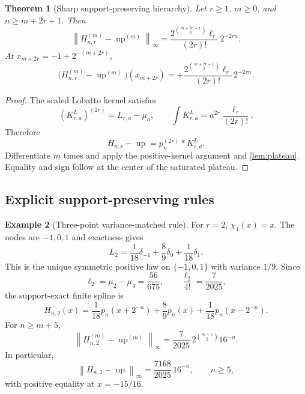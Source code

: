 \documentclass[11pt]{article}
\numberwithin{equation}{section}
\newtheorem{theorem}{Theorem}[section]
\theoremstyle{definition}
\newtheorem{example}[theorem]{Example}
\theoremstyle{remark}
\newcommand{\Up}{\operatorname{up}}
\newcommand{\norm}[1]{\left\lVert#1\right\rVert}
\begin{document}
\begin{theorem}[Sharp support-preserving hierarchy]
\label{thm:L-exact}
Let $r\ge1$, $m\ge0$, and $n\ge m+2r+1$.  Then
\begin{equation}
 \boxed{
 \norm{H_{n,r}^{(m)}-\Up^{(m)}}_\infty
 =\frac{2^{\binom{m+2r+1}{2}}\ell_r}{(2r)!}\,2^{-2rn}.}
 \label{eq:L-exact}
\end{equation}
At $x_{m+2r}=-1+2^{-(m+2r)}$,
\begin{equation}
 \boxed{
 \bigl(H_{n,r}^{(m)}-\Up^{(m)}\bigr)(x_{m+2r})
 =+\frac{2^{\binom{m+2r+1}{2}}\ell_r}{(2r)!}\,2^{-2rn}.}
 \label{eq:L-signed}
\end{equation}
\end{theorem}

\begin{proof}
The scaled Lobatto kernel satisfies
\[
 (K_{r,a}^L)^{(2r)}=L_{r,a}-\mu_a,
 \qquad
 \int K_{r,a}^L=a^{2r}\frac{\ell_r}{(2r)!}.
\]
Therefore
\begin{equation}
 H_{n,r}-\Up=p_n^{(2r)}*K_{r,a}^L.
 \label{eq:L-factorization}
\end{equation}
Differentiate $m$ times and apply the positive-kernel argument and \cref{lem:plateau}.  Equality and sign follow at the center of the saturated plateau.
\end{proof}

\subsection{Explicit support-preserving rules}

\begin{example}[Three-point variance-matched rule]
For $r=2$, $\chi_1(x)=x$.  The nodes are $-1,0,1$ and exactness gives
\begin{equation}
 L_2=\frac1{18}\delta_{-1}+\frac89\delta_0+\frac1{18}\delta_1.
 \label{eq:L2}
\end{equation}
This is the unique symmetric positive law on $\{-1,0,1\}$ with variance $1/9$.  Since
\[
 \ell_2=\mu_2-\mu_4=\frac{56}{675},
 \qquad
 \frac{\ell_2}{4!}=\frac7{2025},
\]
the support-exact finite spline is
\begin{equation}
 \boxed{
 H_{n,2}(x)=\frac1{18}p_n(x+2^{-n})
 +\frac89p_n(x)
 +\frac1{18}p_n(x-2^{-n}).}
 \label{eq:Hn2}
\end{equation}
For $n\ge m+5$,
\begin{equation}
 \boxed{
 \norm{H_{n,2}^{(m)}-\Up^{(m)}}_\infty
 =\frac7{2025}\,2^{\binom{m+5}{2}}16^{-n}.}
 \label{eq:Hn2-error}
\end{equation}
In particular,
\begin{equation}
 \boxed{
 \norm{H_{n,2}-\Up}_\infty
 =\frac{7168}{2025}\,16^{-n},\qquad n\ge5,}
 \label{eq:Hn2-uniform}
\end{equation}
with positive equality at $x=-15/16$.
\end{example}
\end{document}
